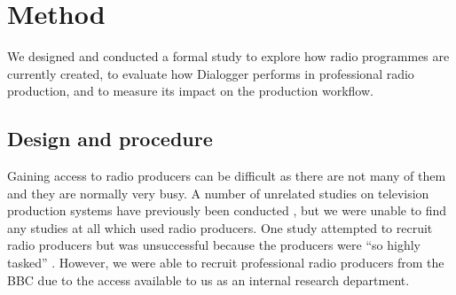 





\section{Method}\label{sec:screen-method}
We designed and conducted a formal study to explore how radio programmes are currently created, to evaluate how
Dialogger performs in professional radio production, and to measure its impact on the production workflow. 

\subsection{Design and procedure}
Gaining access to radio producers can be difficult as there are not many of them and they are normally very busy. A
number of unrelated studies on television production systems have previously been conducted
\citep{Engstroem2010,Perry2009}, but we were unable to find any studies at all which used radio producers. One study
attempted to recruit radio producers but was unsuccessful because the producers were ``so highly tasked''
\citep{Kim2003}. However, we were able to recruit professional radio producers from the BBC due to the access available
to us as an internal research department.

